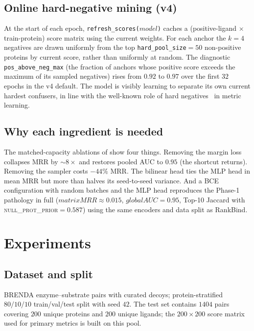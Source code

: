 \documentclass[11pt,a4paper]{article}
\newcommand{\method}{RankBind\xspace}
\newcommand{\nullprior}{\textsc{null\_prot\_prior}\xspace}
\newcommand{\gauc}{global AUC}
\newcommand{\matmrr}{matrix MRR}
\begin{document}
\subsection{Online hard-negative mining (v4)}

At the start of each epoch, \texttt{refresh\_scores($\mathit{model}$)}
caches a (positive-ligand $\times$ train-protein) score matrix using
the current weights. For each anchor the $k=4$ negatives are drawn
uniformly from the top \texttt{hard\_pool\_size}$=50$ non-positive
proteins by current score, rather than uniformly at random. The
diagnostic \texttt{pos\_above\_neg\_max} (the fraction of anchors whose
positive score exceeds the maximum of its sampled negatives) rises from
$0.92$ to $0.97$ over the first $32$ epochs in the v4 default. The
model is visibly learning to separate its own current hardest
confusers, in line with the well-known role of hard
negatives~\citep{harwood2017smartmining,wu2017sampling} in metric
learning.

\subsection{Why each ingredient is needed}

The matched-capacity ablations of  show four things.
Removing the margin loss collapses MRR by $\sim\!8\times$ and restores
pooled AUC to $0.95$ (the shortcut returns). Removing the sampler
costs $-44\%$ MRR. The bilinear head ties the MLP head in mean MRR but
more than halves its seed-to-seed variance. And a BCE configuration
with random batches and the MLP head reproduces the Phase-1 pathology
in full ($\matmrr \approx 0.015$, $\gauc = 0.95$, Top-10 Jaccard with
\nullprior $= 0.587$) using the same encoders and data split as
\method.

\section{Experiments}
\label{sec:experiments}

\subsection{Dataset and split}
BRENDA enzyme--substrate pairs with curated decoys; protein-stratified
$80/10/10$ train/val/test split with seed $42$. The test set contains
$1404$ pairs covering $200$ unique proteins and $200$ unique ligands;
the $200 \times 200$ score matrix used for primary metrics is built on
this pool.
\end{document}

